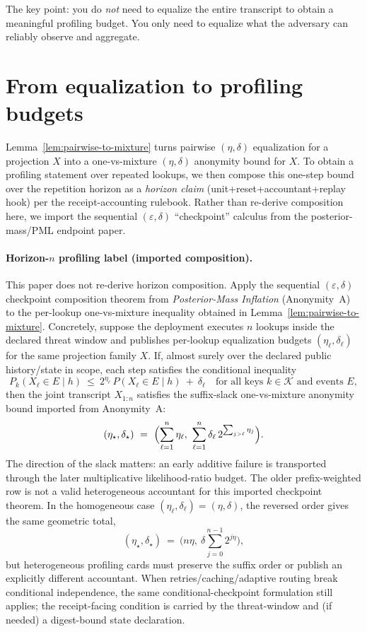 \documentclass[11pt]{article}
\begin{document}
The key point: you do \emph{not} need to equalize the entire transcript to obtain a meaningful profiling budget.
You only need to equalize what the adversary can reliably observe and aggregate.

\section{From equalization to profiling budgets}
Lemma~\ref{lem:pairwise-to-mixture} turns pairwise $(\eta,\delta)$ equalization for a projection $X$ into a one-vs-mixture $(\eta,\delta)$ anonymity bound for $X$.
To obtain a profiling statement over repeated lookups, we then compose this one-step bound over the repetition horizon as a \emph{horizon claim} (unit+reset+accountant+replay hook) per the receipt-accounting rulebook.\cite{series:accountingrulebook,series:threatwindows}
Rather than re-derive composition here, we import the sequential $(\varepsilon,\delta)$ ``checkpoint'' calculus from the posterior-mass/PML endpoint paper.\cite{series:oddsinflation}

\paragraph{Horizon-$n$ profiling label (imported composition).}
This paper does not re-derive horizon composition.
Apply the sequential $(\varepsilon,\delta)$ checkpoint composition theorem from \emph{Posterior-Mass Inflation} (Anonymity~A) to the per-lookup one-vs-mixture inequality obtained in Lemma~\ref{lem:pairwise-to-mixture}.\cite{series:oddsinflation}
Concretely, suppose the deployment executes $n$ lookups inside the declared threat window and publishes per-lookup equalization budgets $(\eta_\ell,\delta_\ell)$ for the same projection family $X$.
If, almost surely over the declared public history/state in scope, each step satisfies the conditional inequality
\[
P_k(X_\ell\in E\mid h)\ \le\ 2^{\eta_\ell}\,P(X_\ell\in E\mid h)\ +\ \delta_\ell
\quad\text{for all keys }k\in\mathcal K\text{ and events }E,
\]
then the joint transcript $X_{1:n}$ satisfies the suffix-slack one-vs-mixture anonymity bound imported from Anonymity~A:
\[
(\eta_\star,\delta_\star)
\ =\
\Bigl(\sum_{\ell=1}^n \eta_\ell,\
      \sum_{\ell=1}^n \delta_\ell\,2^{\sum_{j>\ell}\eta_j}\Bigr).
\]
The direction of the slack matters: an early additive failure is transported through the later multiplicative likelihood-ratio budget.  The older prefix-weighted row is not a valid heterogeneous accountant for this imported checkpoint theorem.
In the homogeneous case $(\eta_\ell,\delta_\ell)=(\eta,\delta)$, the reversed order gives the same geometric total,
\[
(\eta_\star,\delta_\star)
\ =\ \bigl(n\eta,\ \delta\sum_{j=0}^{n-1}2^{j\eta}\bigr),
\]
but heterogeneous profiling cards must preserve the suffix order or publish an explicitly different accountant.
When retries/caching/adaptive routing break conditional independence, the same conditional-checkpoint formulation still applies; the receipt-facing condition is carried by the threat-window and (if needed) a digest-bound state declaration.\cite{series:threatwindows,series:state1,series:planstateequiv}
\end{document}
